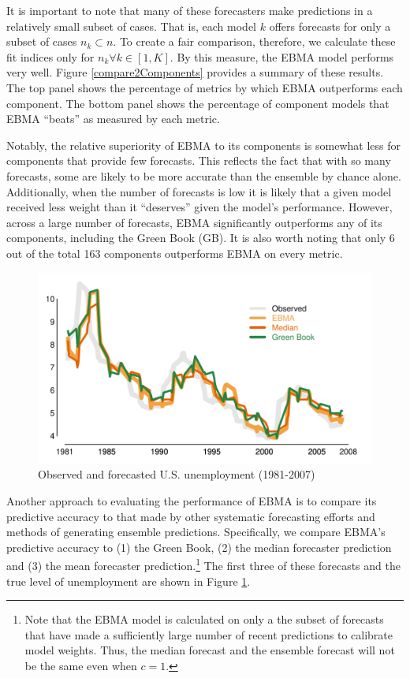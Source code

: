 \documentclass[12pt,fullpage,endnotes]{article}
\begin{document}
It is important to note that many of these forecasters make
predictions in a relatively small subset of cases.  That is, each
model $k$ offers forecasts for only a subset of cases $n_k \subset n$.
To create a fair comparison, therefore, we calculate these fit indices
only for $n_k \forall k \in [1,K]$.  By this measure, the EBMA model
performs very well.  Figure \ref{compare2Components} provides a
summary of these results.  The top panel shows the percentage of
metrics by which EBMA outperforms each component. The bottom panel
shows the percentage of component models that EBMA ``beats'' as
measured by each metric.

Notably, the relative superiority of EBMA to its components is
somewhat less for components that provide few forecasts.  This
reflects the fact that with so many forecasts, some are likely to be
more accurate than the ensemble by chance alone. Additionally, when
the number of forecasts is low it is likely that a given model
received less weight than it ``deserves'' given the model's
performance.  However, across a large number of forecasts, EBMA
significantly outperforms any of its components, including the Green
Book (GB).  It is also worth noting that only 6 out of the total 163
components outperforms EBMA on every metric.

\begin{figure}[h]
\caption{Observed and forecasted U.S. unemployment (1981-2007)}
\label{timeSeries}
\begin{center}
\includegraphics[scale=.8]{mdwtimeSeries2}
\end{center}
\end{figure}


Another approach to evaluating the performance of EBMA is to compare
its predictive accuracy to that made by other systematic forecasting
efforts and methods of generating ensemble predictions.  Specifically,
we compare EBMA's predictive accuracy to (1) the Green Book, (2) the
median forecaster prediction and (3) the mean forecaster
prediction.\footnote{Note that the EBMA model is calculated on only a the
  subset of forecasts that have made a sufficiently large number of
  recent predictions to calibrate model weights.  Thus, the median
  forecast and the ensemble forecast will not be the same even when
  $c=1$.  }  The first three of these forecasts and the true level of
unemployment are shown in Figure \ref{timeSeries}.
\end{document}
